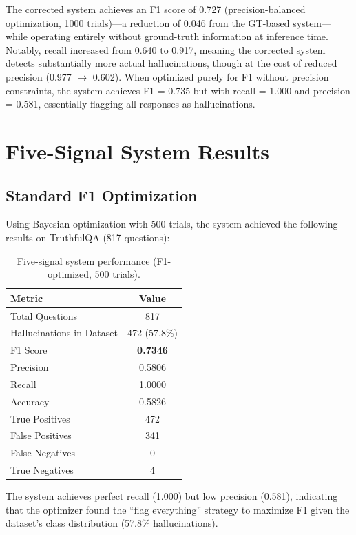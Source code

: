 The corrected system achieves an F1 score of 0.727 (precision-balanced optimization, 1000 trials)---a reduction of 0.046 from the GT-based system---while operating entirely without ground-truth information at inference time. Notably, recall increased from 0.640 to 0.917, meaning the corrected system detects substantially more actual hallucinations, though at the cost of reduced precision (0.977 $\rightarrow$ 0.602). When optimized purely for F1 without precision constraints, the system achieves F1 = 0.735 but with recall = 1.000 and precision = 0.581, essentially flagging all responses as hallucinations.

\section{Five-Signal System Results}

\subsection{Standard F1 Optimization}

Using Bayesian optimization with 500 trials, the system achieved the following results on TruthfulQA (817 questions):

\begin{table}[!htbp]
    \centering
    \caption{Five-signal system performance (F1-optimized, 500 trials).}
    \label{tab:5sig_results}
    \begin{tabular}{lc}
        \toprule
        Metric & Value \\
        \midrule
        Total Questions & 817 \\
        Hallucinations in Dataset & 472 (57.8\%) \\
        \midrule
        F1 Score & \textbf{0.7346} \\
        Precision & 0.5806 \\
        Recall & 1.0000 \\
        Accuracy & 0.5826 \\
        \midrule
        True Positives & 472 \\
        False Positives & 341 \\
        False Negatives & 0 \\
        True Negatives & 4 \\
        \bottomrule
    \end{tabular}
\end{table}

The system achieves perfect recall (1.000) but low precision (0.581), indicating that the optimizer found the ``flag everything'' strategy to maximize F1 given the dataset's class distribution (57.8\% hallucinations).

